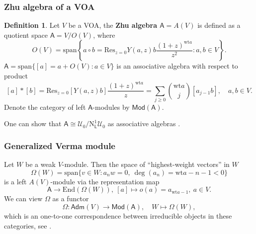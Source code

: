 \documentclass[12pt,a4paper,reqno]{amsart}
\numberwithin{equation}{section}
\numberwithin{equation}{section}
\theoremstyle{definition}
\newtheorem{df}[thm]{Definition}
\newcommand{\Z}{\mathbb{Z}}
\def \ra {\rightarrow}
\def \ssq{\subseteq}
\def \End {\mathrm{End}}
\def\Res{\mathrm{Res}}
\def \wt {\mathrm{wt}}
\def\L{\mathcal{L}}
\def\spn{\mathrm{span}}
\def\Om{\Omega}
\def\scrU{\mathscr{U}}
\def\rN{\mathrm{N}}
\def\L{\mathsf{L}}
\def\rN{\mathrm{N}}
\def\L{\mathsf{L}}
\def\A{\mathsf{A}}
\begin{document}
	
	
	\subsubsection{ Zhu algebra of a VOA}
	
	\begin{df}\cite{Z}\label{def:AV}
		Let $V$ be a VOA, the {\bf Zhu algebra $\A=A(V)$} is defined as a quotient space  $\A=V/O(V)$, where 
		\begin{equation}\label{eq:defofOV}
			O(V)=\spn\left\{ a\circ b=\Res_{z=0}Y(a,z)b\frac{(1+z)^{\wt a}}{z^2}: a,b\in V\right\}.
		\end{equation}
		$\A=\spn\{[a]=a+O(V):a\in V\}$ is an associative algebra with respect to product
		\begin{equation}\label{eq:prodAV}
			[a]\ast [b]=\Res_{z=0} [Y(a,z)b]\frac{(1+z)^{\wt a}}{z}=\sum_{j\geq 0}\binom{\wt a}{j} [a_{j-1}b],\quad a,b\in V.  
		\end{equation}
		Denote the category of left $\A$-modules by $\mathsf{Mod}(\A)$. 
	\end{df}
	One can show that $\A\cong \scrU_0/\rN^1_\L\scrU_0$ as associative algebras \cite{FZ92}. 
	
	\subsubsection{Generalized Verma module}
	
	
	Let $W$ be a weak $V$-module. Then the space of ``highest-weight vectors'' in $W$
	\begin{equation}\label{eq:2.7}
		\Om(W)=\spn\{v\in W: a_nw=0,\ \deg (a_n)=\wt a-n-1<0 \}
	\end{equation}
	is a left $A(V)$-module via the representation map 
	$$
	\A\ra \End(\Om(W)),\ [a]\mapsto o(a)=a_{\wt a-1},\ a\in V.
	$$
	We can view $\Om$ as a functor 
	\begin{equation}\label{eq:defOm}
		\Om: \mathsf{Adm}(V)\ra \mathsf{Mod}(\A),\quad W\mapsto \Om(W),
	\end{equation}
	which is an one-to-one correspondence between irreducible objects in these categories, see \cite[Theorem 2.2.2]{Z}. 
	
\end{document}
